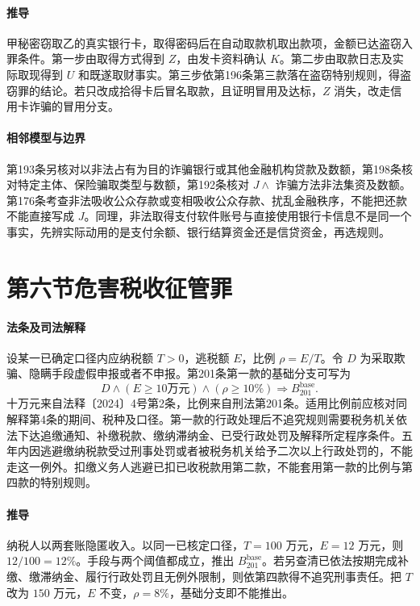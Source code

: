 \paragraph{推导}
甲秘密窃取乙的真实银行卡，取得密码后在自动取款机取出款项，金额已达盗窃入罪条件。第一步由取得方式得到 \(Z\)，由发卡资料确认 \(K\)。第二步由取款日志及实际取现得到 \(U\) 和既遂取财事实。第三步依第196条第三款落在盗窃特别规则，得盗窃罪的结论。若只改成拾得卡后冒名取款，且证明冒用及达标，\(Z\) 消失，改走信用卡诈骗的冒用分支。

\paragraph{相邻模型与边界}
第193条另核对以非法占有为目的诈骗银行或其他金融机构贷款及数额，第198条核对特定主体、保险骗取类型与数额，第192条核对 \(J\land\) 诈骗方法非法集资及数额。第176条考查非法吸收公众存款或变相吸收公众存款、扰乱金融秩序，不能把还款不能直接写成 \(J\)。同理，非法取得支付软件账号与直接使用银行卡信息不是同一个事实，先辨实际动用的是支付余额、银行结算资金还是信贷资金，再选规则。

\section{第六节\quad 危害税收征管罪}

\paragraph{法条及司法解释}
设某一已确定口径内应纳税额 \(T>0\)，逃税额 \(E\)，比例 \(\rho=E/T\)。令 \(D\) 为采取欺骗、隐瞒手段虚假申报或者不申报。第201条第一款的基础分支可写为
\[
D\land (E\ge 10\text{万元})\land(\rho\ge 10\%)
 \Longrightarrow B_{201}^{\mathrm{base}} .
\]
十万元来自法释〔2024〕4号第2条，比例来自刑法第201条。适用比例前应核对同解释第4条的期间、税种及口径。第一款的行政处理后不追究规则需要税务机关依法下达追缴通知、补缴税款、缴纳滞纳金、已受行政处罚及解释所定程序条件。五年内因逃避缴纳税款受过刑事处罚或者被税务机关给予二次以上行政处罚的，不能走这一例外。扣缴义务人逃避已扣已收税款用第二款，不能套用第一款的比例与第四款的特别规则。

\paragraph{推导}
纳税人以两套账隐匿收入。以同一已核定口径，\(T=100\) 万元，\(E=12\) 万元，则 \(12/100=12\%\)。手段与两个阈值都成立，推出 \(B_{201}^{\mathrm{base}}\)。若另查清已依法按期完成补缴、缴滞纳金、履行行政处罚且无例外限制，则依第四款得不追究刑事责任。把 \(T\) 改为 \(150\) 万元，\(E\) 不变，\(\rho=8\%\)，基础分支即不能推出。

